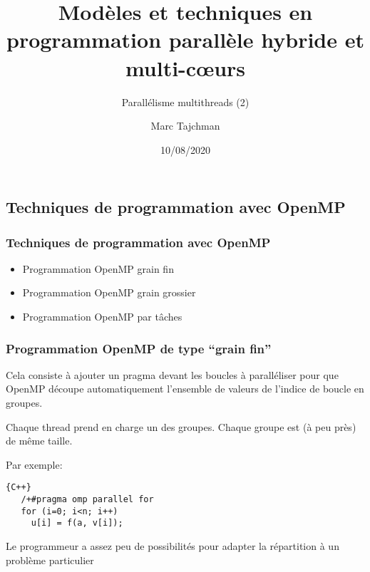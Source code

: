 \documentclass{beamer}
\title{Modèles et techniques en programmation parallèle hybride et multi-c\oe urs}
\subtitle{Parall\'elisme multithreads (2)}
\author{Marc Tajchman}\institute{CEA - DEN/DM2S/STMF/LMES}
\date{10/08/2020}
\begin{document}
\begin{frame}
	\titlepage
\end{frame}

\large
\begin{frame}
	\section{Techniques de programmation avec OpenMP}
	\frametitle{Techniques de programmation avec OpenMP}

\begin{itemize}
	\item Programmation OpenMP grain fin
	\bigskip
	\item Programmation OpenMP grain grossier
	\bigskip
	\item Programmation OpenMP par tâches
\end{itemize}
\end{frame}

\begin{frame}[fragile]
	\frametitle{Programmation OpenMP de type ``grain fin''}
	
	Cela consiste à ajouter un pragma devant les boucles à paralléliser pour que OpenMP découpe automatiquement l'ensemble de valeurs de l'indice de boucle en groupes.
	
	\vfill
	Chaque thread prend en charge un des groupes. Chaque groupe est (à peu près) de même taille.
	\vfill
	
	Par exemple:
	

\begin{lstlisting}{C++}
   /+#pragma omp parallel for
   for (i=0; i<n; i++)
     u[i] = f(a, v[i]);
\end{lstlisting}
	
		
	\vfill
	Le programmeur a assez peu de possibilités pour adapter la répartition à un problème particulier
\end{frame}
\end{document}
